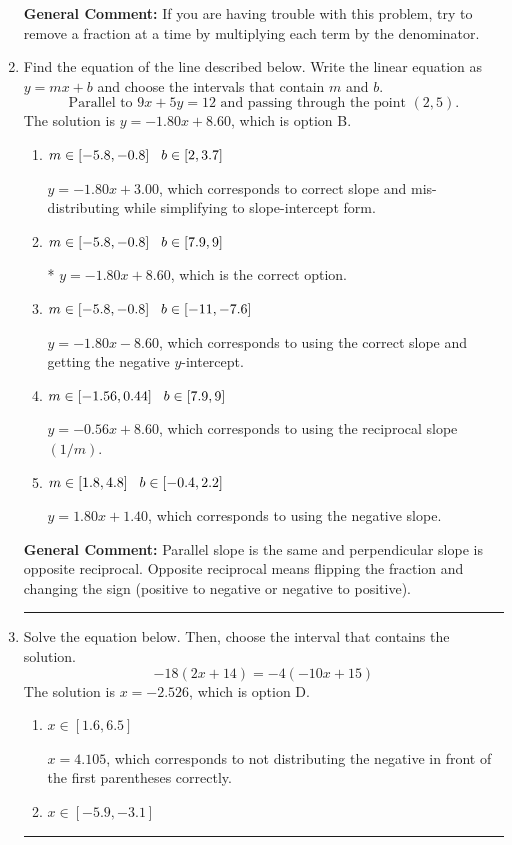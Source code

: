 \documentclass{extbook}[14pt]
\newcommand{\litem}[1]{\item #1

\rule{\textwidth}{0.4pt}}
\begin{document}
\begin{enumerate}
{\textbf{General Comment:} If you are having trouble with this problem, try to remove a fraction at a time by multiplying each term by the denominator.
}
\litem{
Find the equation of the line described below. Write the linear equation as $ y=mx+b $ and choose the intervals that contain $m$ and $b$.
\[ \text{Parallel to } 9 x + 5 y = 12 \text{ and passing through the point } (2, 5). \]The solution is \( y = -1.80x + 8.60 \), which is option B.\begin{enumerate}[label=\Alph*.]
\item \( m \in [-5.8, -0.8] \hspace*{3mm} b \in [2, 3.7] \)

 $y = -1.80x + 3.00$, which corresponds to correct slope and mis-distributing while simplifying to slope-intercept form.
\item \( m \in [-5.8, -0.8] \hspace*{3mm} b \in [7.9, 9] \)

* $y = -1.80x + 8.60$, which is the correct option.
\item \( m \in [-5.8, -0.8] \hspace*{3mm} b \in [-11, -7.6] \)

 $y = -1.80x - 8.60$, which corresponds to using the correct slope and getting the negative $y$-intercept.
\item \( m \in [-1.56, 0.44] \hspace*{3mm} b \in [7.9, 9] \)

 $y = -0.56x + 8.60$, which corresponds to using the reciprocal slope $(1/m)$.
\item \( m \in [1.8, 4.8] \hspace*{3mm} b \in [-0.4, 2.2] \)

 $y = 1.80x + 1.40$, which corresponds to using the negative slope.
\end{enumerate}

\textbf{General Comment:} Parallel slope is the same and perpendicular slope is opposite reciprocal. Opposite reciprocal means flipping the fraction and changing the sign (positive to negative or negative to positive).
}
\litem{
Solve the equation below. Then, choose the interval that contains the solution.
\[ -18(2x + 14) = -4(-10x + 15) \]The solution is \( x = -2.526 \), which is option D.\begin{enumerate}[label=\Alph*.]
\item \( x \in [1.6, 6.5] \)

$x = 4.105$, which corresponds to not distributing the negative in front of the first parentheses correctly.
\item \( x \in [-5.9, -3.1] \)


\end{enumerate}}
\end{enumerate}
\end{document}
